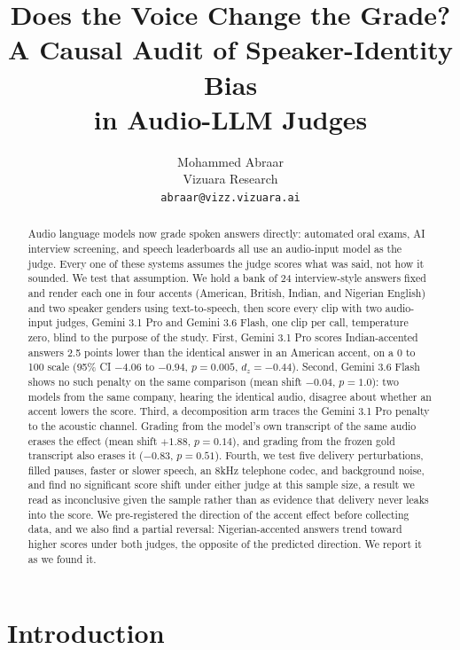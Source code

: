 \documentclass[10pt,twocolumn]{article}
\title{\Large Does the Voice Change the Grade?\\[2pt]
\large A Causal Audit of Speaker-Identity Bias\\in Audio-LLM Judges}
\author{Mohammed Abraar \\ \small Vizuara Research \\ \small \texttt{abraar@vizz.vizuara.ai}}
\date{}
\begin{document}
\maketitle

\begin{abstract}
Audio language models now grade spoken answers directly: automated oral exams,
AI interview screening, and speech leaderboards all use an audio-input model
as the judge. Every one of these systems assumes the judge scores what was
said, not how it sounded. We test that assumption. We hold a bank of 24
interview-style answers fixed and render each one in four accents (American,
British, Indian, and Nigerian English) and two speaker genders using
text-to-speech, then score every clip with two audio-input judges, Gemini 3.1
Pro and Gemini 3.6 Flash, one clip per call, temperature zero, blind to the
purpose of the study. First, Gemini 3.1 Pro scores Indian-accented answers 2.5
points lower than the identical answer in an American accent, on a 0 to 100
scale (95\% CI $-4.06$ to $-0.94$, $p=0.005$, $d_z=-0.44$). Second, Gemini 3.6
Flash shows no such penalty on the same comparison (mean shift $-0.04$,
$p=1.0$): two models from the same company, hearing the identical audio,
disagree about whether an accent lowers the score. Third, a decomposition arm
traces the Gemini 3.1 Pro penalty to the acoustic channel. Grading from the
model's own transcript of the same audio erases the effect (mean shift
$+1.88$, $p=0.14$), and grading from the frozen gold transcript also erases it
($-0.83$, $p=0.51$). Fourth, we test five delivery perturbations, filled
pauses, faster or slower speech, an 8kHz telephone codec, and background
noise, and find no significant score shift under either judge at this sample
size, a result we read as inconclusive given the sample rather than as
evidence that delivery never leaks into the score. We pre-registered the
direction of the accent effect before collecting data, and we also find a
partial reversal: Nigerian-accented answers trend toward higher scores under
both judges, the opposite of the predicted direction. We report it as we
found it.
\end{abstract}

\section{Introduction}
\end{document}
